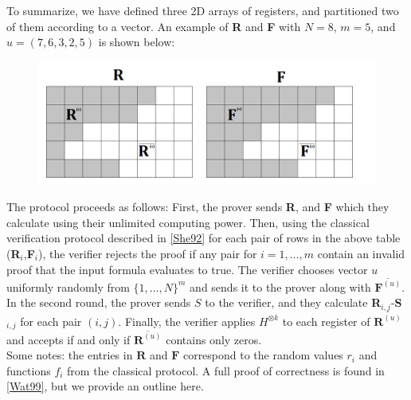 \documentclass[12pt]{article}
\numberwithin{thm}{section}
\numberwithin{defn}{section}
\numberwithin{prop}{section}
\numberwithin{rmk}{section}
\begin{document}
	To summarize, we have defined three 2D arrays of registers, and partitioned two of them according to a vector. An example of \textbf{R} and \textbf{F} with $N=8$, $m=5$, and $u=(7,6,3,2,5)$ is shown below:
	\begin{figure}[h!]
		\centering
		\includegraphics[width=\linewidth]{R grid.png}
	\end{figure}
	
	The protocol proceeds as follows: First, the prover sends \textbf{R}, and \textbf{F} which they calculate using their unlimited computing power. Then, using the classical verification protocol described in \hyperref[she92]{[She92]} for each pair of rows in the above table (\textbf{R}$_i$,\textbf{F}$_i$), the verifier rejects the proof if any pair for $i=1,\dots,m$ contain an invalid proof that the input formula evaluates to true. The verifier chooses vector $u$ uniformly randomly from $\{1,\dots,N\}^m$ and sends it to the prover along with $\overline{\textbf{F}^{(u)}}$. In the second round, the prover sends $S$ to the verifier, and they calculate \textbf{R}$_{i,j}$-\textbf{S}$_{i,j}$ for each pair $(i,j)$. Finally, the verifier applies $H^{\otimes k}$ to each register of $\overline{\textbf{R}^{(u)}}$ and accepts if and only if $\overline{\textbf{R}^{(u)}}$ contains only zeros.\\
	
	Some notes: the entries in $\textbf{R}$ and $\textbf{F}$ correspond to the random values $r_i$ and functions $f_i$ from the classical protocol. A full proof of correctness is found in \hyperref[wat99]{[Wat99]}, but we provide an outline here.
	
\end{document}
